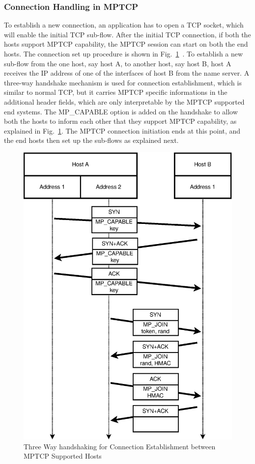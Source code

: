 \subsubsection{Connection Handling in MPTCP}
To establish a new connection, an application has to open a TCP socket, which will enable the initial TCP sub-flow. After the initial TCP connection, if both the hosts support MPTCP capability, the MPTCP session can start on both the end hosts. The connection set up procedure is  shown in Fig.~\ref{fig:ConnectionHandling}~\cite{barreia2014multipath}.
To establish a new sub-flow from the one host, say host A, to another host, say host B, host A receives the IP address of one of the interfaces of host B from the name server. A three-way handshake mechanism is used for connection establishment, which is similar to normal TCP, but it carries MPTCP specific informations in the additional header fields, which are only interpretable by the MPTCP supported end systems. The MP\_CAPABLE option is added on the handshake to allow both the hosts to inform each other that they support MPTCP capability, as explained in Fig.~\ref{fig:ConnectionHandling}. The MPTCP connection initiation ends at this point, and the end hosts then set up the sub-flows as explained next. 

\begin{figure}[!ht]
    \centering
    \includegraphics[width=.5\textwidth]{img/mptcp/mptcp_con}
    \caption{Three Way handshaking for Connection Establishment between MPTCP Supported Hosts}
    \label{fig:ConnectionHandling}
\end{figure}

